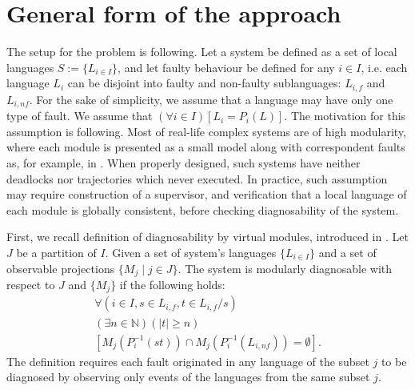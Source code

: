 \documentclass[a4paper, 10pt, conference]{ieeeconf}
\begin{document}
\section{General form of the approach}
\label{sec:General}


% 

The setup for the problem is following. Let a system be defined as a set of
local languages $S := \{L_{i\in I}\}$, and let faulty behaviour be defined for
any $i \in I$, i.e. each language $L_i$ can be disjoint into faulty and
non-faulty sublanguages: $L_{i,f}$ and $L_{i,nf}$. For the sake of simplicity,
we assume that a language may have only one type of fault. We assume that
$(\forall i \in I)\left[ L_i = P_i(L)\right]$. The motivation for this
assumption is following. Most of real-life complex systems are of high
modularity, where each module is presented as a small model along with
correspondent faults as, for example, in \cite{sartini_methodology_2010}. When
properly designed, such systems have neither deadlocks nor trajectories which
never executed. In practice, such assumption may require construction of a
supervisor, and verification that a local language of each module is globally
consistent, before checking diagnosability of the system.

First, we recall definition of diagnosability by virtual modules, introduced in
\cite{myadzelets_virtual_2013}.
Let $J$ be a partition of $I$. Given a set of system's languages $\{L_{i \in
I}\}$ and a set of observable projections $\{M_j \mid j \in J \}$. 
The system is modularly diagnosable with respect to $J$ and $\{M_j\}$ 
if the following holds:
\begin{equation}
	\begin{array}{l}
		\forall(i \in I, s \in L_{i,f}, t \in L_{i,f}/s)
		\\
		(\exists n \in \mathbb{N})
		(|t| \geq n)
		\\
		\left[ M_j(P_i^{-1}(st)) \cap M_j(P_i^{-1}(L_{i,nf})) = \emptyset \right].
	\end{array}
\end{equation}
The definition requires each fault originated in any language of the subset $j$
to be diagnosed by observing only events of the languages from the same subset
$j$.
\end{document}
